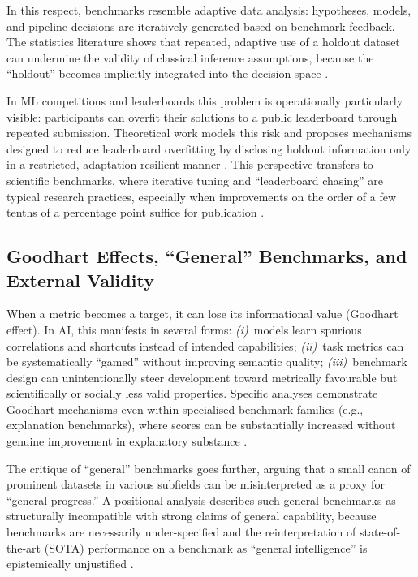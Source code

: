 \documentclass[12pt, a4paper]{article}
\begin{document}
In this respect, benchmarks resemble adaptive data analysis: hypotheses,
models, and pipeline decisions are iteratively generated based on
benchmark feedback.  The statistics literature shows that repeated,
adaptive use of a holdout dataset can undermine the validity of
classical inference assumptions, because the ``holdout'' becomes
implicitly integrated into the decision space \cite{Dwork2015}.

In ML competitions and leaderboards this problem is operationally
particularly visible: participants can overfit their solutions to a
public leaderboard through repeated submission.  Theoretical work models
this risk and proposes mechanisms designed to reduce leaderboard
overfitting by disclosing holdout information only in a restricted,
adaptation-resilient manner \cite{Blum2015}.  This perspective transfers
to scientific benchmarks, where iterative tuning and ``leaderboard
chasing'' are typical research practices, especially when improvements
on the order of a few tenths of a percentage point suffice for
publication \cite{Bouthillier2021}.

\subsection{Goodhart Effects, ``General'' Benchmarks, and External
            Validity}
\label{sec:goodhart}

When a metric becomes a target, it can lose its informational value
(Goodhart effect).  In AI, this manifests in several forms:
\emph{(i)}~models learn spurious correlations and shortcuts instead of
intended capabilities; \emph{(ii)}~task metrics can be systematically
``gamed'' without improving semantic quality; \emph{(iii)}~benchmark
design can unintentionally steer development toward metrically
favourable but scientifically or socially less valid properties.
Specific analyses demonstrate Goodhart mechanisms even within
specialised benchmark families (e.g., explanation benchmarks), where
scores can be substantially increased without genuine improvement in
explanatory substance \cite{Hsia2024}.

The critique of ``general'' benchmarks goes further, arguing that a
small canon of prominent datasets in various subfields can be
misinterpreted as a proxy for ``general progress.''  A positional
analysis describes such general benchmarks as structurally incompatible
with strong claims of general capability, because benchmarks are
necessarily under-specified and the reinterpretation of state-of-the-art
(SOTA) performance on a benchmark as ``general intelligence'' is
epistemically unjustified \cite{Raji2021}.
\end{document}

